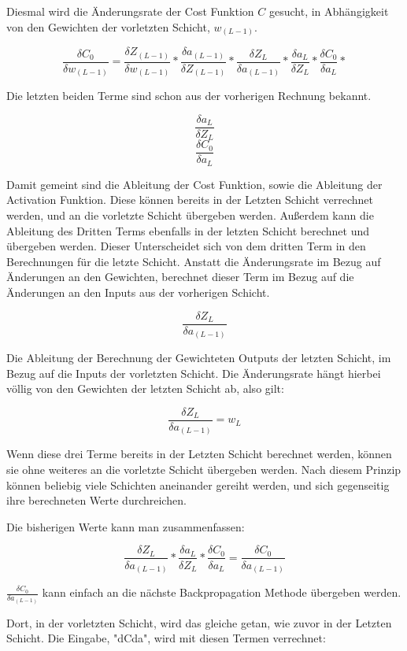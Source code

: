 \documentclass[12pt]{article}
\begin{document}
Diesmal wird die Änderungsrate der Cost Funktion $C$ gesucht, in Abhängigkeit von den Gewichten der vorletzten Schicht, $w_{(L-1)}$.

$$\frac{\delta C_0}{\delta w_{(L-1)}}=
\frac{\delta Z_{(L-1)}}{\delta w_{(L-1)}}*
\frac{\delta a_{(L-1)}}{\delta Z_{(L-1)}}*
\frac{\delta Z_L}{\delta a_{(L-1)}}*
\frac{\delta a_L}{\delta Z_L}*
\frac{\delta C_0}{\delta a_L}*
$$

Die letzten beiden Terme sind schon aus der vorherigen Rechnung bekannt.

$$\frac{\delta a_L}{\delta Z_L}$$
$$\frac{\delta C_0}{\delta a_L}$$

Damit gemeint sind die Ableitung der Cost Funktion, sowie die Ableitung der Activation Funktion. Diese können bereits in der Letzten Schicht verrechnet werden, und an die vorletzte Schicht übergeben werden. Außerdem kann die Ableitung des Dritten Terms ebenfalls in der letzten Schicht berechnet und übergeben werden. Dieser Unterscheidet sich von dem dritten Term in den Berechnungen für die letzte Schicht. Anstatt die Änderungsrate im Bezug auf Änderungen an den Gewichten, berechnet dieser Term im Bezug auf die Änderungen an den Inputs aus der vorherigen Schicht.

$$\frac{\delta Z_L}{\delta a_{(L-1)}}$$

Die Ableitung der Berechnung der Gewichteten Outputs der letzten Schicht, im Bezug auf die Inputs der vorletzten Schicht. Die Änderungsrate hängt hierbei völlig von den Gewichten der letzten Schicht ab, also gilt:

$$\frac{\delta Z_L}{\delta a_{(L-1)}} = w_L$$

Wenn diese drei Terme bereits in der Letzten Schicht berechnet werden, können sie ohne weiteres an die vorletzte Schicht übergeben werden. Nach diesem Prinzip können beliebig viele Schichten aneinander gereiht werden, und sich gegenseitig ihre berechneten Werte durchreichen. 

Die bisherigen Werte kann man zusammenfassen:

$$
\frac{\delta Z_L}{\delta a_{(L-1)}}*
\frac{\delta a_L}{\delta Z_L}*
\frac{\delta C_0}{\delta a_L}
= \frac{\delta C_0}{\delta a_{(L-1)}}
$$

$\frac{\delta C_0}{\delta a_{(L-1)}}$ kann einfach an die nächste Backpropagation Methode übergeben werden.

Dort, in der vorletzten Schicht, wird das gleiche getan, wie zuvor in der Letzten Schicht. Die Eingabe, "dCda", wird mit diesen Termen verrechnet:
\end{document}
